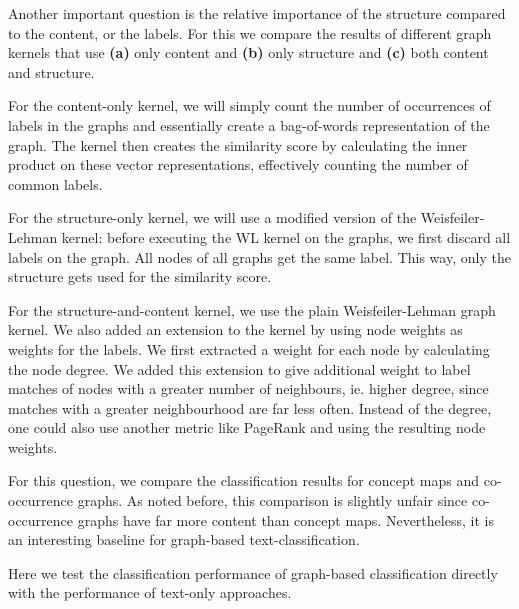 Another important question is the relative importance of the structure compared to the content, or the labels.
For this we compare the results of different graph kernels that use \textbf{(a)} only content and \textbf{(b)} only structure and \textbf{(c)} both content and structure.

For the content-only kernel, we will simply count the number of occurrences of labels in the graphs and essentially create a bag-of-words representation of the graph. The kernel then creates the similarity score by calculating the inner product on these vector representations, effectively counting the number of common labels.

For the structure-only kernel, we will use a modified version of the Weisfeiler-Lehman kernel: before executing the WL kernel on the graphs, we first discard all labels on the graph. All nodes of all graphs get the same label. This way, only the structure gets used for the similarity score.

For the structure-and-content kernel, we use the plain Weisfeiler-Lehman graph kernel. We also added an extension to the kernel by using node weights as weights for the labels. We first extracted a weight for each node by calculating the node degree.
We added this extension to give additional weight to label matches of nodes with a greater number of neighbours, ie. higher degree, since matches with a greater neighbourhood are far less often.
Instead of the degree, one could also use another metric like PageRank and using the resulting node weights.


For this question, we compare the classification results for concept maps and co-occurrence graphs. As noted before, this comparison is slightly unfair since co-occurrence graphs have far more content than concept maps.
Nevertheless, it is an interesting baseline for graph-based text-classification.

Here we test the classification performance of graph-based classification directly with the performance of text-only approaches.


